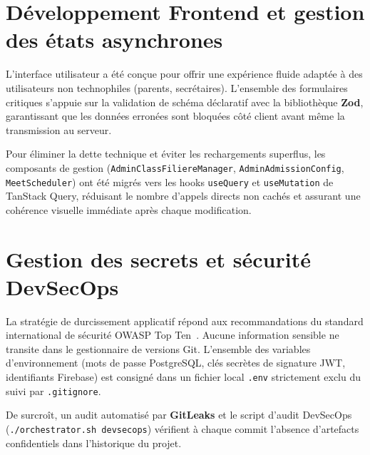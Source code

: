 \section{Développement Frontend et gestion des états asynchrones}

L'interface utilisateur a été conçue pour offrir une expérience fluide adaptée à des utilisateurs non technophiles (parents, secrétaires). L'ensemble des formulaires critiques s'appuie sur la validation de schéma déclaratif avec la bibliothèque \textbf{Zod}, garantissant que les données erronées sont bloquées côté client avant même la transmission au serveur.

Pour éliminer la dette technique et éviter les rechargements superflus, les composants de gestion (\texttt{AdminClassFiliereManager}, \texttt{AdminAdmissionConfig}, \texttt{MeetScheduler}) ont été migrés vers les hooks \texttt{useQuery} et \texttt{useMutation} de TanStack Query, réduisant le nombre d'appels directs non cachés et assurant une cohérence visuelle immédiate après chaque modification.

\section{Gestion des secrets et sécurité DevSecOps}

La stratégie de durcissement applicatif répond aux recommandations du standard international de sécurité OWASP Top Ten~\cite{owasp2021}. Aucune information sensible ne transite dans le gestionnaire de versions Git. L'ensemble des variables d'environnement (mots de passe PostgreSQL, clés secrètes de signature JWT, identifiants Firebase) est consigné dans un fichier local \texttt{.env} strictement exclu du suivi par \texttt{.gitignore}.

De surcroît, un audit automatisé par \textbf{GitLeaks} et le script d'audit DevSecOps (\texttt{./orchestrator.sh devsecops}) vérifient à chaque commit l'absence d'artefacts confidentiels dans l'historique du projet.
